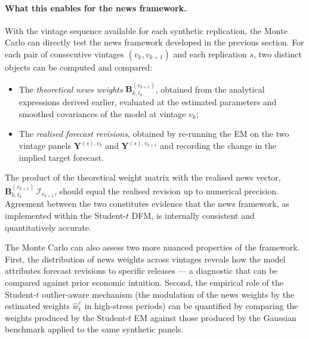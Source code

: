 \documentclass[11pt, a4paper, oneside]{article}
\begin{document}
\paragraph{What this enables for the news framework.}
With the vintage sequence available for each synthetic replication,
the Monte Carlo can directly test the news framework developed in
the previous section. For each pair of consecutive vintages
$(v_k, v_{k+1})$ and each replication $s$, two distinct objects
can be computed and compared:
\begin{itemize}[leftmargin=1.5em, itemsep=3pt]
    \item The \emph{theoretical news weights}
          $\mathbf{B}_{k, t_k}^{(v_{k+1})}$, obtained from the
          analytical expressions derived earlier, evaluated at the
          estimated parameters and smoothed covariances of the
          model at vintage $v_k$;
    \item The \emph{realised forecast revisions}, obtained by
          re-running the EM on the two vintage panels
          $\mathbf{Y}^{(s), v_k}$ and $\mathbf{Y}^{(s), v_{k+1}}$
          and recording the change in the implied target forecast.
\end{itemize}
The product of the theoretical weight matrix with the realised
news vector,
$\mathbf{B}_{k, t_k}^{(v_{k+1})}\, \mathcal{I}_{v_{k+1}}$, should
equal the realised revision up to numerical precision. Agreement
between the two constitutes evidence that the news framework, as
implemented within the Student-$t$ DFM, is internally consistent
and quantitatively accurate.

The Monte Carlo can also assess two more nuanced properties of
the framework. First, the distribution of news weights across
vintages reveals how the model attributes forecast revisions to
specific releases — a diagnostic that can be compared against
prior economic intuition. Second, the empirical role of the
Student-$t$ outlier-aware mechanism (the modulation of the news
weights by the estimated weights $\hat{w}_t^\varepsilon$ in
high-stress periods) can be quantified by comparing the weights
produced by the Student-$t$ EM against those produced by the
Gaussian benchmark applied to the same synthetic panels.
\end{document}
